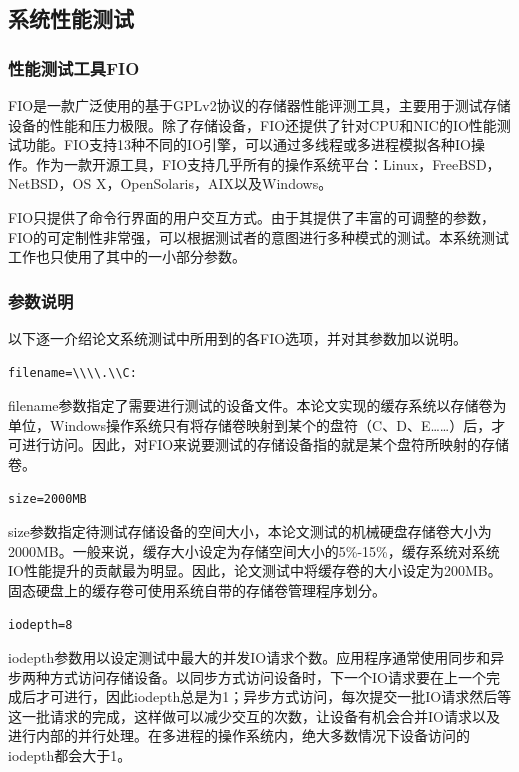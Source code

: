 \subsection{系统性能测试}

\subsubsection{性能测试工具FIO}
FIO是一款广泛使用的基于GPLv2协议的存储器性能评测工具，主要用于测试存储设备的性能和压力极限。除了存储设备，FIO还提供了针对CPU和NIC的IO性能测试功能。FIO支持13种不同的IO引擎，可以通过多线程或多进程模拟各种IO操作。作为一款开源工具，FIO支持几乎所有的操作系统平台：Linux，FreeBSD，NetBSD，OS X，OpenSolaris，AIX以及Windows。

FIO只提供了命令行界面的用户交互方式。由于其提供了丰富的可调整的参数，FIO的可定制性非常强，可以根据测试者的意图进行多种模式的测试。本系统测试工作也只使用了其中的一小部分参数。

\subsubsection{参数说明}

以下逐一介绍论文系统测试中所用到的各FIO选项，并对其参数加以说明。

\begin{lstlisting}
filename=\\\\.\\C:
\end{lstlisting}

filename参数指定了需要进行测试的设备文件。本论文实现的缓存系统以存储卷为单位，Windows操作系统只有将存储卷映射到某个的盘符（C、D、E……）后，才可进行访问。因此，对FIO来说要测试的存储设备指的就是某个盘符所映射的存储卷。

\begin{lstlisting}
size=2000MB
\end{lstlisting}

size参数指定待测试存储设备的空间大小，本论文测试的机械硬盘存储卷大小为2000MB。一般来说，缓存大小设定为存储空间大小的5\%-15\%，缓存系统对系统IO性能提升的贡献最为明显。因此，论文测试中将缓存卷的大小设定为200MB。固态硬盘上的缓存卷可使用系统自带的存储卷管理程序划分。

\begin{lstlisting}
iodepth=8
\end{lstlisting}

iodepth参数用以设定测试中最大的并发IO请求个数。应用程序通常使用同步和异步两种方式访问存储设备。以同步方式访问设备时，下一个IO请求要在上一个完成后才可进行，因此iodepth总是为1；异步方式访问，每次提交一批IO请求然后等这一批请求的完成，这样做可以减少交互的次数，让设备有机会合并IO请求以及进行内部的并行处理。在多进程的操作系统内，绝大多数情况下设备访问的iodepth都会大于1。

